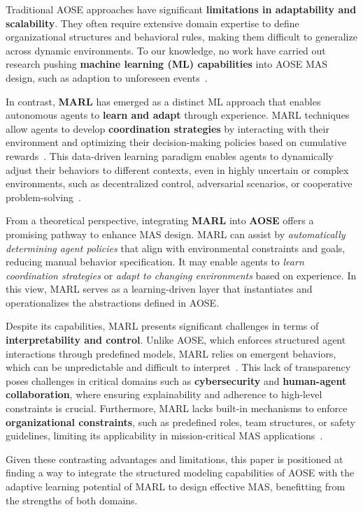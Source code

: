 \documentclass[journal]{IEEEtai}
\begin{document}
Traditional AOSE approaches have significant \textbf{limitations in adaptability and scalability}. They often require extensive domain expertise to define organizational structures and behavioral rules, making them difficult to generalize across dynamic environments. To our knowledge, no work have carried out research pushing \textbf{machine learning (ML) capabilities} into AOSE MAS design, such as adaption to unforeseen events~\cite{Garcia2004}.

In contrast, \textbf{MARL} has emerged as a distinct ML approach that enables autonomous agents to \textbf{learn and adapt} through experience. MARL techniques allow agents to develop \textbf{coordination strategies} by interacting with their environment and optimizing their decision-making policies based on cumulative rewards~\cite{Zhang2021}. This data-driven learning paradigm enables agents to dynamically adjust their behaviors to different contexts, even in highly uncertain or complex environments, such as decentralized control, adversarial scenarios, or cooperative problem-solving~\cite{Papoudakis2021}.

From a theoretical perspective, integrating \textbf{MARL} into \textbf{AOSE} offers a promising pathway to enhance MAS design. MARL can assist by \textit{automatically determining agent policies} that align with environmental constraints and goals, reducing manual behavior specification. It may enable agents to \textit{learn coordination strategies} or \textit{adapt to changing environments} based on experience. In this view, MARL serves as a learning-driven layer that instantiates and operationalizes the abstractions defined in AOSE.

Despite its capabilities, MARL presents significant challenges in terms of \textbf{interpretability and control}. Unlike AOSE, which enforces structured agent interactions through predefined models, MARL relies on emergent behaviors, which can be unpredictable and difficult to interpret~\cite{Du2022}. This lack of transparency poses challenges in critical domains such as \textbf{cybersecurity} and \textbf{human-agent collaboration}, where ensuring explainability and adherence to high-level constraints is crucial. Furthermore, MARL lacks built-in mechanisms to enforce \textbf{organizational constraints}, such as predefined roles, team structures, or safety guidelines, limiting its applicability in mission-critical MAS applications~\cite{Nguyen2020}.

Given these contrasting advantages and limitations, this paper is positioned at finding a way to integrate the structured modeling capabilities of AOSE with the adaptive learning potential of MARL to design effective MAS, benefitting from the strengths of both domains.
\end{document}
